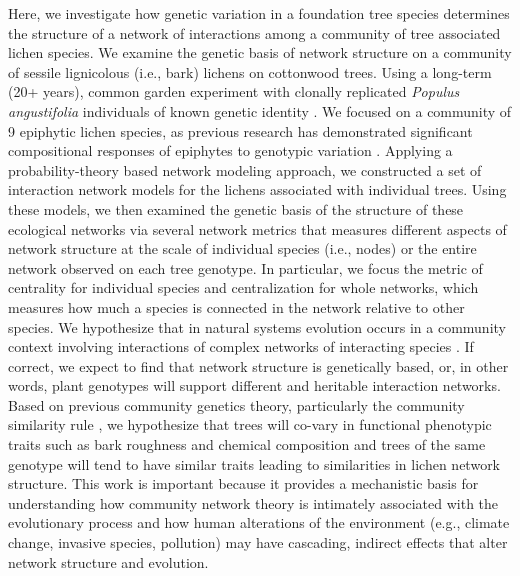 \documentclass[11pt,twocolumn,twoside,lineno]{pnas-new}
\begin{document}
Here, we investigate how genetic variation in a foundation tree
species determines the structure of a network of interactions among a
community of tree associated lichen species. We examine the genetic
basis of network structure on a community of sessile lignicolous
(i.e., bark) lichens on cottonwood trees. Using a long-term (20+
years), common garden experiment with clonally replicated
\textit{Populus angustifolia} individuals of known genetic identity
. We focused on a community of 9 epiphytic lichen species, as previous
research has demonstrated significant compositional responses of
epiphytes to genotypic variation \citep{Winfree2011,
  Zytynska2011}. Applying a probability-theory based network modeling
approach, we constructed a set of interaction network models for the
lichens associated with individual trees. Using these models, we then
examined the genetic basis of the structure of these ecological
networks via several network metrics that measures different aspects
of network structure at the scale of individual species (i.e., nodes)
or the entire network observed on each tree genotype. In particular,
we focus the metric of centrality for individual species and
centralization for whole networks, which measures how much a species
is connected in the network relative to other species. We hypothesize
that in natural systems evolution occurs in a community context
involving interactions of complex networks of interacting species
\cite{Lau2015a, Keith2017, Thompson2013, Bascompte2006}. If correct,
we expect to find that network structure is genetically based, or, in
other words, plant genotypes will support different and heritable
interaction networks. Based on previous community genetics theory,
particularly the community similarity rule \citep{Bangert2006}, we
hypothesize that trees will co-vary in functional phenotypic traits
such as bark roughness and chemical composition and trees of the same
genotype will tend to have similar traits leading to similarities in
lichen network structure. This work is important because it provides a
mechanistic basis for understanding how community network theory is
intimately associated with the evolutionary process and how human
alterations of the environment (e.g., climate change, invasive
species, pollution) may have cascading, indirect effects that alter
network structure and evolution.
\end{document}

